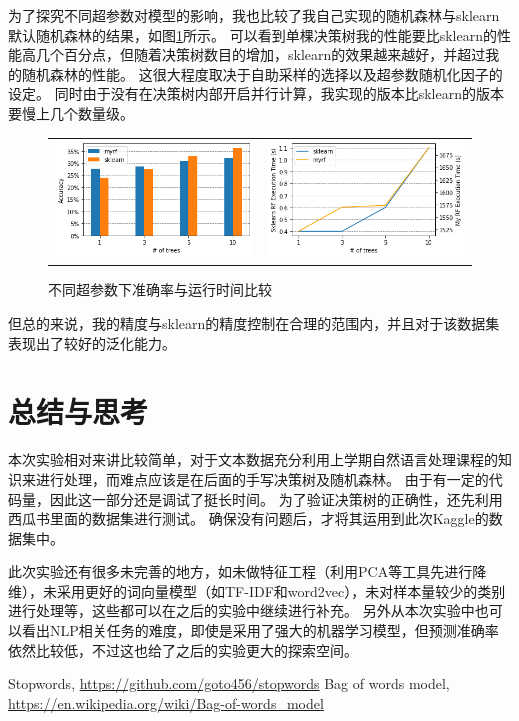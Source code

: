 \documentclass[logo,reportComp]{thesis}
\begin{document}
为了探究不同超参数对模型的影响，我也比较了我自己实现的随机森林与sklearn默认随机森林的结果，如图\ref{fig:hyper}所示。
可以看到单棵决策树我的性能要比sklearn的性能高几个百分点，但随着决策树数目的增加，sklearn的效果越来越好，并超过我的随机森林的性能。
这很大程度取决于自助采样的选择以及超参数随机化因子的设定。
同时由于没有在决策树内部开启并行计算，我实现的版本比sklearn的版本要慢上几个数量级。
\begin{figure}[H]
\centering
\begin{tabular}{cc}
\includegraphics[width=0.5\linewidth]{fig/accuracy.png}&
\includegraphics[width=0.5\linewidth]{fig/exe_time.png}
\end{tabular}
\caption{不同超参数下准确率与运行时间比较}
\label{fig:hyper}
\end{figure}

但总的来说，我的精度与sklearn的精度控制在合理的范围内，并且对于该数据集表现出了较好的泛化能力。

\section{总结与思考}
本次实验相对来讲比较简单，对于文本数据充分利用上学期自然语言处理课程的知识来进行处理，而难点应该是在后面的手写决策树及随机森林。
由于有一定的代码量，因此这一部分还是调试了挺长时间。
为了验证决策树的正确性，还先利用西瓜书里面的数据集进行测试。
确保没有问题后，才将其运用到此次Kaggle的数据集中。

此次实验还有很多未完善的地方，如未做特征工程（利用PCA等工具先进行降维），未采用更好的词向量模型（如TF-IDF和word2vec），未对样本量较少的类别进行处理等，这些都可以在之后的实验中继续进行补充。
另外从本次实验中也可以看出NLP相关任务的难度，即使是采用了强大的机器学习模型，但预测准确率依然比较低，不过这也给了之后的实验更大的探索空间。

\begin{thebibliography}{99}
 Stopwords, \url{https://github.com/goto456/stopwords}
 Bag of words model, \url{https://en.wikipedia.org/wiki/Bag-of-words_model}
\end{thebibliography}
\end{document}
